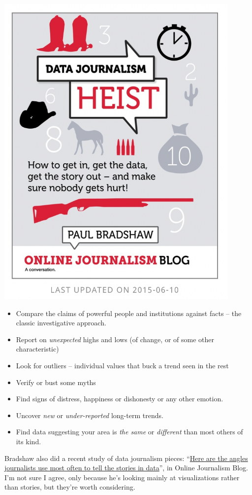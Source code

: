 \documentclass[
  letterpaper,
  DIV=11,
  numbers=noendperiod]{scrreprt}
\providecommand{\tightlist}{%
  \setlength{\itemsep}{0pt}\setlength{\parskip}{0pt}}\usepackage{longtable,booktabs,array}
\begin{document}
\includegraphics[width=0.9\textwidth,height=\textheight]{./images/start-story-heist.png}

\begin{itemize}
\tightlist
\item
  Compare the claims of powerful people and institutions against facts
  -- the classic investigative approach.
\item
  Report on \emph{unexpected} highs and lows (of change, or of some
  other characteristic)
\item
  Look for outliers -- individual values that buck a trend seen in the
  rest
\item
  Verify or bust some myths
\item
  Find signs of distress, happiness or dishonesty or any other emotion.
\item
  Uncover \emph{new} or \emph{under-reported} long-term trends.
\item
  Find data suggesting your area is \emph{the same} or \emph{different}
  than most others of its kind.
\end{itemize}

Bradshaw also did a recent study of data journalism pieces:
``\href{https://onlinejournalismblog.com/2020/08/11/here-are-the-7-types-of-stories-most-often-found-in-data/}{Here
are the angles journalists use most often to tell the stories in
data}'', in Online Journalism Blog. I'm not sure I agree, only because
he's looking mainly at visualizations rather than stories, but they're
worth considering.
\end{document}
